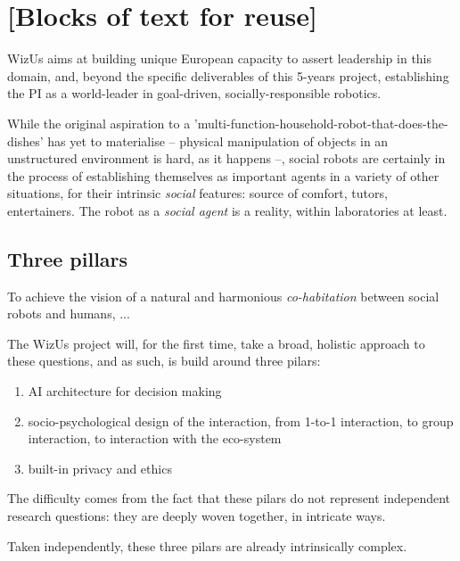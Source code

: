 \documentclass[11pt]{report}
\newcommand{\project}{WizUs\xspace}
\begin{document}
\section{[Blocks of text for reuse]}

\project aims at building unique European capacity to assert leadership in this
domain, and, beyond the specific deliverables of this 5-years project,
establishing the PI as a world-leader in goal-driven, socially-responsible
robotics.


While the original aspiration to a
'multi-function-household-robot-that-does-the-dishes' has yet to materialise --
physical manipulation of objects in an unstructured environment is hard, as it
happens --, social robots are certainly in the process of establishing
themselves as important agents in a variety of other situations, for their
intrinsic \emph{social} features: source of comfort, tutors, entertainers. The
robot as a \emph{social agent} is a reality, within laboratories at least.


\subsection{Three pillars}

To achieve the vision of a natural and harmonious \emph{co-habitation} between
social robots and humans, ...

The \project project will, for the first time, take a broad, holistic approach
to these questions, and as such, is build around three pilars:

\begin{enumerate}
    \item AI architecture for decision making
    \item socio-psychological design of the interaction, from 1-to-1
        interaction, to group interaction, to interaction with the eco-system
    \item built-in privacy and ethics
\end{enumerate}

The difficulty comes from the fact that these pilars do not represent independent
research questions: they are deeply woven together, in intricate ways.


Taken independently, these three pilars are already intrinsically complex.
\end{document}
